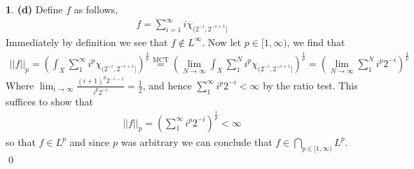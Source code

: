 \documentclass[10.5pt]{article}
\theoremstyle{definition}
\newtheorem{pb}{}
\newcommand{\norm}[1]{\lvert\lvert#1\rvert\rvert}
\begin{document}
\begin{pb}
        \textbf{(d)} Define \(f\) as follows,
        \begin{align*}
            f = \sum_{i=1}^\infty i\chi_{(2^{-i},2^{-i + 1}]}
        \end{align*}
        Immediately by definition we see that \(f \not \in L^\infty\). Now let \(p \in [1,\infty)\), we find that
        \begin{align*}
            \norm{f}_p = \left(\int_X \sum_1^\infty i^p\chi_{(2^{-i},2^{-i + 1}]}\right)^{\frac{1}{p}} \overset{\text{MCT}}{=} \left(\lim_{N\to\infty}\int_X \sum_1^N i^p\chi_{(2^{-i},2^{-i + 1}]}\right)^{\frac{1}{p}} = \left(\lim_{N\to\infty}\sum_1^N i^p2^{-i}\right)^{\frac{1}{p}}
        \end{align*}
        Where \(\lim_{i\to\infty}\frac{(i+1)^p2^{-i-1}}{i^p2^{-i}} = \frac12\), and hence \(\sum_1^\infty i^p2^{-i} < \infty\) by the ratio test. This suffices to show that
        \begin{align*}
            \norm{f}_p = \left(\sum_1^\infty i^p2^{-i}\right)^{\frac{1}{p}} < \infty
        \end{align*}
        so that \(f \in L^p\) and since \(p\) was arbitrary we can conclude that \(f \in \bigcap_{p \in [1,\infty)}L^p\). \qed
    \end{pb}
\end{document}
